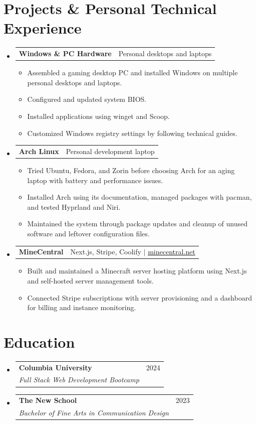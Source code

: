 \documentclass[letterpaper,11pt]{article}
\makeatletter
\newcommand{\entry}[4]{\item\begin{tabular*}{0.97\textwidth}[t]{l@{\extracolsep{\fill}}r}\textbf{#1}& #2\\\textit{\small #3}&\textit{\small #4}\\\end{tabular*}\vspace{-7pt}}
\newcommand{\project}[2]{\item\begin{tabular*}{0.97\textwidth}{l@{\extracolsep{\fill}}r}\textbf{#1}&\small #2\\\end{tabular*}\vspace{-7pt}}
\newcommand{\items}{\begin{itemize}[leftmargin=0.17in,itemsep=1pt,topsep=5pt,parsep=0pt]\small}
\newcommand{\finishitems}{\end{itemize}\vspace{-5pt}}
\newcommand{\entries}{\begin{itemize}[leftmargin=0.15in,label={},itemsep=5pt,topsep=2pt]}
\newcommand{\finishentries}{\end{itemize}}
\makeatother
\begin{document}
\section{Projects \& Personal Technical Experience}
\entries
\project{Windows \& PC Hardware}{Personal desktops and laptops}
\items
\item Assembled a gaming desktop PC and installed Windows on multiple personal desktops and laptops.
\item Configured and updated system BIOS.
\item Installed applications using winget and Scoop.
\item Customized Windows registry settings by following technical guides.
\finishitems
\project{Arch Linux}{Personal development laptop}
\items
\item Tried Ubuntu, Fedora, and Zorin before choosing Arch for an aging laptop with battery and performance issues.
\item Installed Arch using its documentation, managed packages with pacman, and tested Hyprland and Niri.
\item Maintained the system through package updates and cleanup of unused software and leftover configuration files.
\finishitems
\project{MineCentral}{Next.js, Stripe, Coolify $|$ \href{https://minecentral.net}{minecentral.net}}
\items
\item Built and maintained a Minecraft server hosting platform using Next.js and self-hosted server management tools.
\item Connected Stripe subscriptions with server provisioning and a dashboard for billing and instance monitoring.
\finishitems
\finishentries

\section{Education}
\entries
\entry{Columbia University}{2024}{Full Stack Web Development Bootcamp}{}
\entry{The New School}{2023}{Bachelor of Fine Arts in Communication Design}{}
\finishentries
\end{document}
